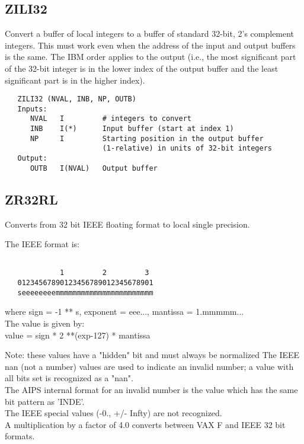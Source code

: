 \subsection{ZILI32}
Convert a buffer of local integers to a buffer of standard
32-bit, 2's complement integers.  This must work even when the
address of the input and output buffers is the same.  The IBM order
applies to the output (i.e., the most significant part of the 32-bit
integer is in the lower index of the output buffer and the least
significant part is in the higher index).
\begin{verbatim}
   ZILI32 (NVAL, INB, NP, OUTB)
   Inputs:
      NVAL   I         # integers to convert
      INB    I(*)      Input buffer (start at index 1)
      NP     I         Starting position in the output buffer
                       (1-relative) in units of 32-bit integers
   Output:
      OUTB   I(NVAL)   Output buffer

\end{verbatim}

\subsection{ZR32RL}
Converts from 32 bit IEEE floating format to local single precision.

The IEEE format is:
\begin{verbatim}

             1         2         3
   01234567890123456789012345678901
   seeeeeeeemmmmmmmmmmmmmmmmmmmmmmm

\end{verbatim}
where sign = -1 ** s, exponent = eee..., mantissa = 1.mmmmm...\\

The value is given by:\\

   value = sign * 2 **(exp-127) * mantissa

Note: these values have a "hidden" bit and must always be normalized
The IEEE nan (not a number) values are used to indicate an invalid
number; a value with all bits set is recognized as a "nan".\\
The AIPS internal format for an invalid number is the value which
has the same bit pattern as 'INDE'.\\
The IEEE special values (-0., +/- Infty) are not recognized.\\
A multiplication by a factor of 4.0 converts between VAX F and IEEE
32 bit formats.

